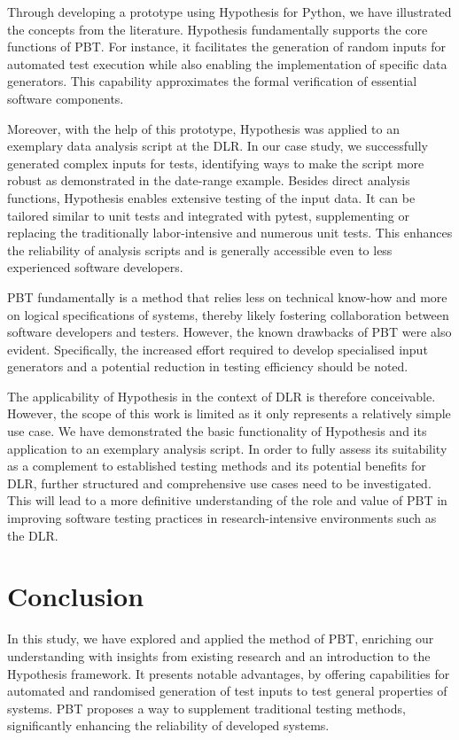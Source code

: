 \documentclass[runningheads]{llncs}
\begin{document}
Through developing a prototype using Hypothesis for Python, we have illustrated the concepts from the literature. Hypothesis fundamentally supports the core functions of PBT. For instance, it facilitates the generation of random inputs for automated test execution while also enabling the implementation of specific data generators. This capability approximates the formal verification of essential software components.

Moreover, with the help of this prototype, Hypothesis was applied to an exemplary data analysis script at the DLR. In our case study, we successfully generated complex inputs for tests, identifying ways to make the script more robust as demonstrated in the date-range example. Besides direct analysis functions, Hypothesis enables extensive testing of the input data. It can be tailored similar to unit tests and integrated with pytest, supplementing or replacing the traditionally labor-intensive and numerous unit tests. This enhances the reliability of analysis scripts and is generally accessible even to less experienced software developers.

PBT fundamentally is a method that relies less on technical know-how and more on logical specifications of systems, thereby likely fostering collaboration between software developers and testers. However, the known drawbacks of PBT were also evident. Specifically, the increased effort required to develop specialised input generators and a potential reduction in testing efficiency should be noted.

The applicability of Hypothesis in the context of DLR is therefore conceivable. However, the scope of this work is limited as it only represents a relatively simple use case. We have demonstrated the basic functionality of Hypothesis and its application to an exemplary analysis script. In order to fully assess its suitability as a complement to established testing methods and its potential benefits for DLR, further structured and comprehensive use cases need to be investigated. This will lead to a more definitive understanding of the role and value of PBT in improving software testing practices in research-intensive environments such as the DLR.

\section{Conclusion}
In this study, we have explored and applied the method of PBT, enriching our understanding with insights from existing research and an introduction to the Hypothesis framework. It presents notable advantages, by offering capabilities for automated and randomised generation of test inputs to test general properties of systems. PBT proposes a way to supplement traditional testing methods, significantly enhancing the reliability of developed systems.
\end{document}
